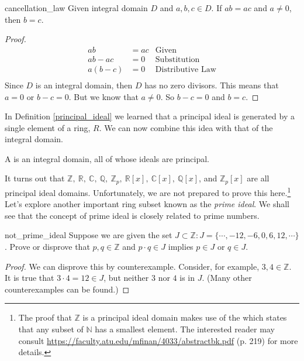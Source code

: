 \begin{prop}{cancellation_law}
Given integral domain $D$ and $a,b,c\in D$.  If $ab=ac$ and $a\neq 0$, then $b=c$.

\begin{proof}
\begin{align*}
    ab&=ac & \text{Given}\\
    ab-ac&=0 & \text{Substitution}\\
    a(b-c)&=0 & \text{Distributive Law}\\
\end{align*}
Since $D$ is an integral domain, then $D$ has no zero divisors.  This means that $a=0$ or $b-c=0$.  But we know that $a\neq 0$.  So $b-c=0$ and $b=c$.
\end{proof}
\end{prop}


In Definition \ref{principal_ideal} we learned that a principal ideal is generated by a single element of a ring, $R$.  We can now combine this idea with that of the integral domain.

\begin{defn}\label{princ_ideal_dom}
A  is an integral domain, all of whose ideals are principal.
\end{defn}

It turns out that ${\mathbb Z},~{\mathbb R},~{\mathbb C},~{\mathbb Q},~{\mathbb Z}_p,~{\mathbb R}[x],~{\mathbb C}[x],~{\mathbb Q}[x]$, and ${\mathbb Z}_p[x]$ are all principal ideal domains.  Unfortunately, we are not prepared to prove this here.\footnote{The proof that ${\mathbb Z}$ is a principal ideal domain makes use of the  which states that any subset of ${\mathbb N}$ has a smallest element.  The interested reader may consult \url{https://faculty.atu.edu/mfinan/4033/abstractbk.pdf} (p. 219) for more details.}\\

Let's explore another important ring subset known as the \emph{prime ideal}.  We shall see that the concept of prime ideal is closely related to prime numbers.


\begin{example}{not_prime_ideal}
Suppose we are given the set $J\subset{\mathbb Z}:J=\{\cdots,-12,-6,0,6,12,\cdots\}$.  Prove or disprove that $p,q\in{\mathbb Z}$ and $p\cdot q\in J$ implies $p\in J$ or $q\in J$. 
\end{example}

\begin{proof}
We can disprove this by counterexample.  Consider, for example, $3,4\in{\mathbb Z}$.  It is true that $3\cdot 4=12\in J$, but neither $3$ nor $4$ is in $J$.  (Many other counterexamples can be found.)
\end{proof}

